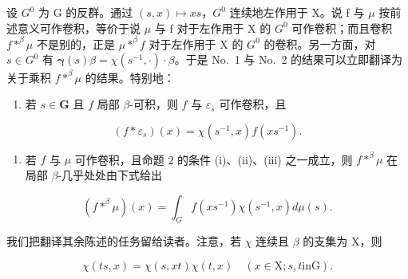 设 \(G^{0}\) 为 G 的反群。通过 \((s,x)\mapsto xs\)，\(G^{0}\) 连续地左作用于 X。说 f 与 \(\mu\) 按前述意义可作卷积，等价于说 \(\mu\) 与 f 对于左作用于 X 的 \(G^{0}\) 可作卷积；而且卷积 \(f * ^ {\beta} \mu\) 不是别的，正是 \(\mu * ^ {\beta} f\) 对于左作用于 X 的 \(G^{0}\) 的卷积。另一方面，对 \(s\in G^{0}\) 有 \(\pmb{\gamma}(s)\beta = \chi(s^{-1},\cdot)\cdot \beta\)。于是 No.~1 与 No.~2 的结果可以立即翻译为关于乘积 \(f * ^ {\beta} \mu\) 的结果。特别地：

\begin{enumerate}
\def\labelenumi{\arabic{enumi})}
\tightlist
\item
  若 \(s \in \mathbf{G}\) 且 \(f\) 局部 \(\beta\)-可积，则 \(f\) 与 \(\varepsilon_s\) 可作卷积，且
\end{enumerate}

\[
(f * \varepsilon_ {s}) (x) = \chi (s ^ {- 1}, x) f (x s ^ {- 1}).\tag{4}
\]

\begin{enumerate}
\def\labelenumi{\arabic{enumi})}
\setcounter{enumi}{1}
\tightlist
\item
  若 \(f\) 与 \(\mu\) 可作卷积，且命题 2 的条件 (i)、(ii)、(iii) 之一成立，则 \(f *^{\beta} \mu\) 在局部 \(\beta\)-几乎处处由下式给出
\end{enumerate}

\[
(f * ^ {\beta} \mu) (x) = \int_ {G} f (x s ^ {- 1}) \chi (s ^ {- 1}, x) d \mu (s).\tag{5}
\]

我们把翻译其余陈述的任务留给读者。注意，若 \(\chi\) 连续且 \(\beta\) 的支集为 X，则

\[
\chi (t s, x) = \chi (s, x t) \chi (t, x) \quad (x \in \mathrm{X}; s, t \text {in} \mathrm{G}).\tag{6}
\]

